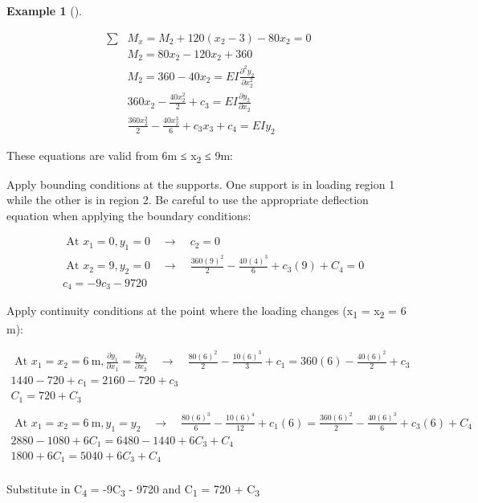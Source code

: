 \documentclass[
  letterpaper,
  DIV=11,
  numbers=noendperiod]{scrreprt}
\theoremstyle{definition}
\newtheorem{example}{Example}[chapter]
\theoremstyle{remark}
\begin{document}
\begin{tcolorbox}
\begin{example}[]
\begin{tcolorbox}
\[
\begin{aligned}
\sum & M_x= M_2+120\left(x_2-3\right)-80 x_2=0 \\ 
&M_2  =80 x_2-120 x_2+360 \\ 
&M_2 =360-40 x_2=E I \frac{\partial^2 y_2}{\partial x_2^2} \\ 
&360 x_2-\frac{40 x_2^2}{2}+c_3=E I \frac{\partial y_2}{\partial x_2} \\ 
&\frac{360 x_2^2}{2}-\frac{40 x_2^3}{6}+c_3 x_3+c_4  =E I y_2
\end{aligned}
\]

These equations are valid from 6m ≤ x\textsubscript{2} ≤ 9m:

Apply bounding conditions at the supports. One support is in loading
region 1 while the other is in region 2. Be careful to use the
appropriate deflection equation when applying the boundary conditions:

\[
\begin{aligned} & \text { At } x_1=0, y_1=0 \quad \rightarrow \quad c_2=0 \\ & \text { At } x_2=9, y_2=0 \quad \rightarrow \quad \frac{360(9)^2}{2}-\frac{40(4)^3}{6}+c_3(9) +C_4=0 \\ & c_4=-9 c_3-9720\end{aligned}
\]

Apply continuity conditions at the point where the loading changes
(x\textsubscript{1} = x\textsubscript{2} = 6 m):

\[
\begin{gathered} \text { At } x_1=x_2=6 \mathrm{~m}, \frac{\partial y_1}{\partial x_1}=\frac{\partial y_2}{\partial x_2} \quad \rightarrow \quad \frac{80(6)^2}{2}-\frac{10(6)^3}{3}+c_1=360(6)-\frac{40(6)^2}{2}+c_3 \\ 1440-720+c_1=2160-720+c_3 \\ C_1=720+C_3 \\ \\  \text { At } x_1=x_2=6 \mathrm{~m}, y_1=y_2 \quad \rightarrow \quad\frac{80(6)^3}{6}-\frac{10(6)^4}{12}+c_1(6)=\frac{360(6)^2}{2} - \frac{40(6)^3}{6}+c_3(6) +C_4 \\ 2880-1080+6 C_1=6480-1440+6 C_3+C_4 \\ 1800+6 C_1=5040+6 C_3+C_4 \\\end{gathered}
\]

Substitute in C\textsubscript{4} = -9C\textsubscript{3} - 9720 and
C\textsubscript{1} = 720 + C\textsubscript{3}


\end{tcolorbox}
\end{example}
\end{tcolorbox}
\end{document}
